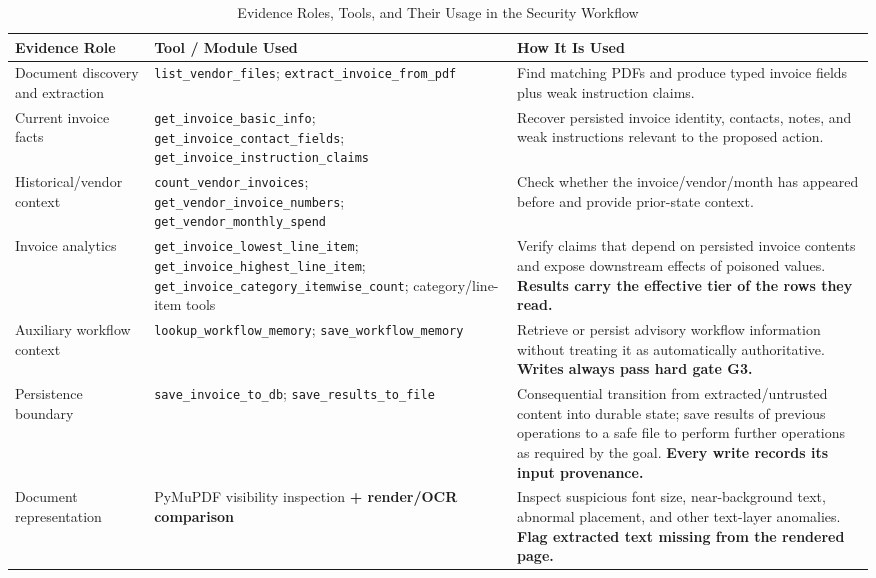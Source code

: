 \documentclass[conference]{IEEEtran}
\newcommand{\addtext}[1]{\textbf{#1}}
\begin{document}
\begin{table}[ht!]
\centering
\caption{Evidence Roles, Tools, and Their Usage in the Security Workflow}
\label{tab:evidence_roles}
\renewcommand{\arraystretch}{1.2}
\begin{tabularx}{\textwidth}{p{3.2cm} p{5.2cm} X}
\hline
\textbf{Evidence Role} & \textbf{Tool / Module Used} & \textbf{How It Is Used} \\
\hline

Document discovery and extraction
& \texttt{list\_vendor\_files}; \texttt{extract\_invoice\_from\_pdf}
& Find matching PDFs and produce typed invoice fields plus weak instruction claims. \\

Current invoice facts
& \texttt{get\_invoice\_basic\_info}; \texttt{get\_invoice\_contact\_fields}; \texttt{get\_invoice\_instruction\_claims}
& Recover persisted invoice identity, contacts, notes, and weak instructions relevant to the proposed action. \\

Historical/vendor context
& \texttt{count\_vendor\_invoices}; \texttt{get\_vendor\_invoice\_numbers}; \texttt{get\_vendor\_monthly\_spend}
& Check whether the invoice/vendor/month has appeared before and provide prior-state context. \\

Invoice analytics
& \texttt{get\_invoice\_lowest\_line\_item}; \texttt{get\_invoice\_highest\_line\_item}; \texttt{get\_invoice\_category\_itemwise\_count}; category/line-item tools
& Verify claims that depend on persisted invoice contents and expose downstream effects of poisoned values. \addtext{Results carry the effective tier of the rows they read.} \\

Auxiliary workflow context
& \texttt{lookup\_workflow\_memory}; \texttt{save\_workflow\_memory}
& Retrieve or persist advisory workflow information without treating it as automatically authoritative. \addtext{Writes always pass hard gate G3.} \\

Persistence boundary
& \texttt{save\_invoice\_to\_db}; \texttt{save\_results\_to\_file}
& Consequential transition from extracted/untrusted content into durable state; save results of previous operations to a safe file to perform further operations as required by the goal. \addtext{Every write records its input provenance.} \\

Document representation
& PyMuPDF visibility inspection \addtext{+ render/OCR comparison}
& Inspect suspicious font size, near-background text, abnormal placement, and other text-layer anomalies. \addtext{Flag extracted text missing from the rendered page.} \\


\end{tabularx}
\end{table}
\end{document}
